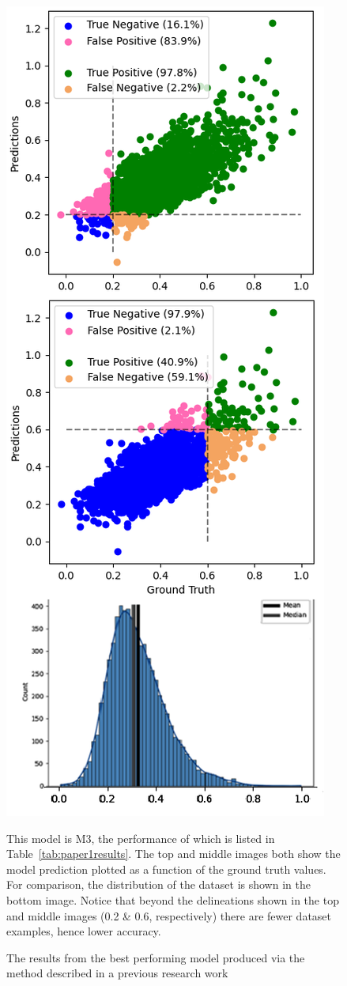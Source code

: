 \begin{figure}[p]
	\centering
	\includegraphics[scale=0.5]{Figures/paper1_results_analysis.png}
	\caption{The results from the best performing model produced via the method described in a previous research work} {This model is M3, the performance of which is listed in Table~\ref{tab:paper1results}. The top and middle images both show the model prediction plotted as a function of the ground truth values. For comparison, the distribution of the dataset is shown in the bottom image. Notice that beyond the delineations shown in the top and middle images (0.2 \& 0.6, respectively) there are fewer dataset examples, hence lower accuracy.}
	\label{fig:data_distribution_results}
\end{figure}

